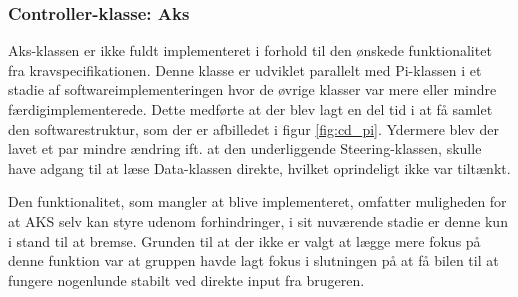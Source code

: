 \subsubsection{Controller-klasse: Aks} \label{sec:aks_impl}

Aks-klassen er ikke fuldt implementeret i forhold til den ønskede funktionalitet fra kravspecifikationen.
Denne klasse er udviklet parallelt med Pi-klassen i et stadie af softwareimplementeringen hvor de øvrige klasser var mere eller mindre færdigimplementerede.
Dette medførte at der blev lagt en del tid i at få samlet den softwarestruktur, som der er afbilledet i figur \ref{fig:cd_pi}.
Ydermere blev der lavet et par mindre ændring ift. at den underliggende Steering-klassen, skulle have adgang til at læse Data-klassen direkte, hvilket oprindeligt ikke var tiltænkt.

Den funktionalitet, som mangler at blive implementeret, omfatter muligheden for at AKS selv kan styre udenom forhindringer, i sit nuværende stadie er denne kun i stand til at bremse.
Grunden til at der ikke er valgt at lægge mere fokus på denne funktion var at gruppen havde lagt fokus i slutningen på at få bilen til at fungere nogenlunde stabilt ved direkte input fra brugeren.